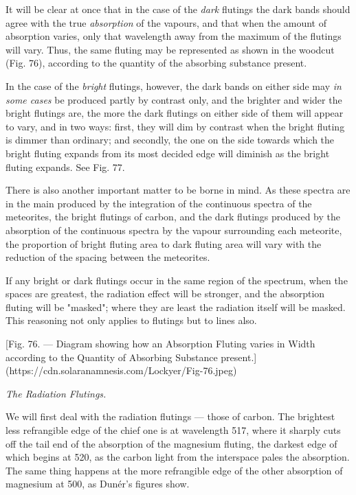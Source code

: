 \documentclass[a4paper, 12pt, oneside, polutonikogreek, english]{article}
\begin{document}
It will be clear at once that in the case of the \emph{dark} flutings the dark bands should agree with the true \emph{absorption} of the vapours, and that when the amount of absorption varies, only that wavelength away from the maximum of the flutings will vary. Thus, the same fluting may be represented as shown in the woodcut (Fig. 76), according to the quantity of the absorbing substance present.

In the case of the \emph{bright} flutings, however, the dark bands on either side may \emph{in some cases} be produced partly by contrast only, and the brighter and wider the bright flutings are, the more the dark flutings on either side of them will appear to vary, and in two ways: first, they will dim by contrast when the bright fluting is dimmer than ordinary; and secondly, the one on the side towards which the bright fluting expands from its most decided edge will diminish as the bright fluting expands. See Fig. 77.

There is also another important matter to be borne in mind. As these spectra are in the main produced by the integration of the continuous spectra of the meteorites, the bright flutings of carbon, and the dark flutings produced by the absorption of the continuous spectra by the vapour surrounding each meteorite, the proportion of bright fluting area to dark fluting area will vary with the reduction of the spacing between the meteorites.

If any bright or dark flutings occur in the same region of the spectrum, when the spaces are greatest, the radiation effect will be stronger, and the absorption fluting will be "masked"; where they are least the radiation itself will be masked. This reasoning not only applies to flutings but to lines also.

[Fig. 76. --- Diagram showing how an Absorption Fluting varies in Width according to the Quantity of Absorbing Substance present.](https://cdn.solaranamnesis.com/Lockyer/Fig-76.jpeg)

\emph{The Radiation Flutings.}

We will first deal with the radiation flutings --- those of carbon. The brightest less refrangible edge of the chief one is at wavelength 517, where it sharply cuts off the tail end of the absorption of the magnesium fluting, the darkest edge of which begins at 520, as the carbon light from the interspace pales the absorption. The same thing happens at the more refrangible edge of the other absorption of magnesium at 500, as Dunér's figures show.
\end{document}
